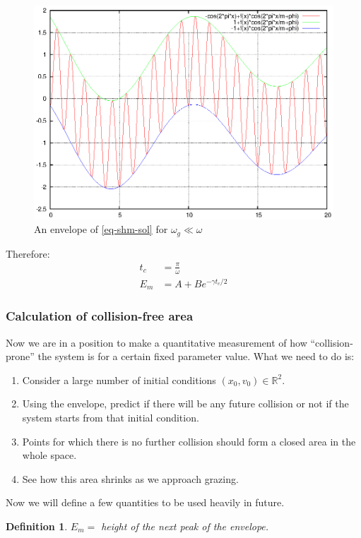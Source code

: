 \documentclass{book}
\renewcommand{\(}{\begin{columns}}
\renewcommand{\)}{\end{columns}}
\newcommand{\<}[1]{\begin{column}{#1}}
\renewcommand{\>}{\end{column}}
\newtheorem{definition}{Definition}[section]
\begin{document}
\begin{figure}[!htb]
\begin{center}
\caption{An envelope of \eqref{eq-shm-sol} for $\omega_g\ll\omega$}
\includegraphics[width=0.6\columnwidth]{envelope-m-large}
\end{center}
\end{figure}

Therefore:
\begin{align}
t_c&=\frac{\pi}{\omega}\\
E_m&=A+Be^{-\gamma t_c/2}
\end{align}



\subsubsection{Calculation of collision-free area}
Now we are in a position to make a quantitative measurement of how 
``collision-prone'' the system is for a certain fixed parameter value.  What 
we need to do is:

\begin{enumerate}
\item Consider a large number of initial conditions $(x_0,v_0)\in \mathbb{R}^2$.  
\item Using the envelope, predict if there will be 
any future collision or not if the system starts from that initial condition.  
\item Points for which there is no further collision should form a closed area 
in the whole space.  
\item See how this area shrinks as we approach grazing.  
\end{enumerate}

Now we will define a few quantities to be used heavily in future.  

\begin{definition}
$E_m= $ height of the next peak of the envelope.  
\end{definition}
\end{document}
